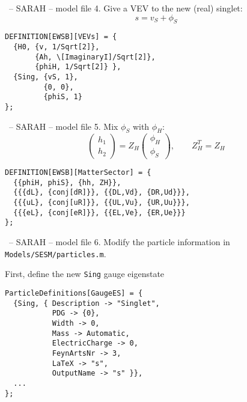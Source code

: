 \documentclass[11pt]{beamer}
\begin{document}
\begin{frame}[fragile]{\insertsection\ -- SARAH -- model file}
  4. Give a VEV to the new (real) singlet:
  \begin{equation*}
    s = v_S + \phi_S
  \end{equation*}
  \begin{lstlisting}
DEFINITION[EWSB][VEVs] = {
  {H0, {v, 1/Sqrt[2]},
       {Ah, \[ImaginaryI]/Sqrt[2]},
       {phiH, 1/Sqrt[2]} },
  {Sing, {vS, 1},
         {0, 0},
         {phiS, 1}
};\end{lstlisting}
\end{frame}


\begin{frame}[fragile]{\insertsection\ -- SARAH -- model file}
  5. Mix $\phi_S$ with $\phi_H$:
  \begin{equation*}
    \begin{pmatrix}
      h_1 \\ h_2
    \end{pmatrix}
    =
    Z_H
    \begin{pmatrix}
      \phi_H \\ \phi_S
    \end{pmatrix},
    \qquad
    Z_H^T = Z_H
  \end{equation*}
  \begin{lstlisting}
DEFINITION[EWSB][MatterSector] = {
  {{phiH, phiS}, {hh, ZH}},
  {{{dL}, {conj[dR]}}, {{DL,Vd}, {DR,Ud}}},
  {{{uL}, {conj[uR]}}, {{UL,Vu}, {UR,Uu}}},
  {{{eL}, {conj[eR]}}, {{EL,Ve}, {ER,Ue}}}
};\end{lstlisting}
\end{frame}


\begin{frame}[fragile]{\insertsection\ -- SARAH -- model file}
  6. Modify the particle information in
  \texttt{Models/SESM/particles.m}.

  \bigskip

  First, define the new \texttt{Sing} gauge eigenstate
  \begin{lstlisting}
ParticleDefinitions[GaugeES] = {
  {Sing, { Description -> "Singlet",
           PDG -> {0},
           Width -> 0,
           Mass -> Automatic,
           ElectricCharge -> 0,
           FeynArtsNr -> 3,
           LaTeX -> "s",
           OutputName -> "s" }},
  ...
};\end{lstlisting}
\end{frame}
\end{document}
